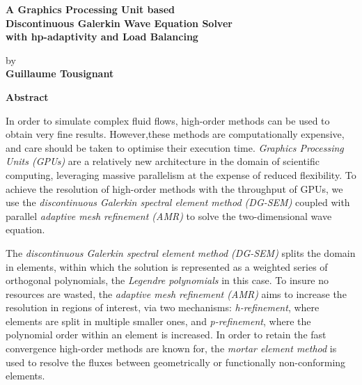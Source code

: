 \thispagestyle{plain} %

\begin{center}
	\vspace*{0.5cm} %
	{ \Large
		\textbf{A Graphics Processing Unit based \\ 
			Discontinuous Galerkin Wave Equation Solver \\
			with hp-adaptivity and Load Balancing \\
		}
	}
	\vspace{0.4cm}
	\large

	by \\
	\vspace{0.4cm}
	\textbf{Guillaume Tousignant}
	
	\vspace{0.9cm}
	\textbf{Abstract}
	
\end{center}

In order to simulate complex fluid flows, high-order methods can be used to obtain very fine 
results. However,these methods are computationally expensive, and care should be taken to optimise 
their execution time. \textit{Graphics Processing Units (GPUs)} are a relatively new architecture 
in the domain of scientific computing, leveraging massive parallelism at the expense of reduced 
flexibility. To achieve the resolution of high-order methods with the throughput of GPUs, we use 
the \textit{discontinuous Galerkin spectral element method (DG-SEM)} coupled with parallel 
\textit{adaptive mesh refinement (AMR)} to solve the two-dimensional wave equation. 

The \textit{discontinuous Galerkin spectral element method (DG-SEM)} splits the domain in elements, 
within which the solution is represented as a weighted series of orthogonal polynomials, the 
\textit{Legendre polynomials} in this case. To insure no resources are wasted, the 
\textit{adaptive mesh refinement (AMR)} aims to increase the resolution in regions of interest, via 
two mechanisms: \textit{h-refinement}, where elements are split in multiple smaller ones, and 
\textit{p-refinement}, where the polynomial order within an element is increased. In order to retain 
the fast convergence high-order methods are known for, the \textit{mortar element method} is used to
resolve the fluxes between geometrically or functionally non-conforming elements.

